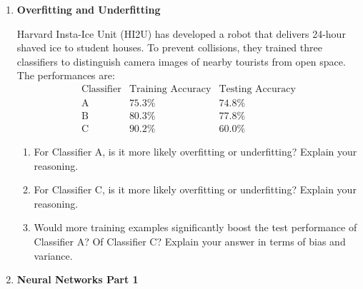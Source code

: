 \documentclass{article}
\begin{document}
\begin{enumerate}[label=\textbf{\arabic*.}]
    \item \textbf{Overfitting and Underfitting}

    Harvard Insta-Ice Unit (HI2U) has developed a robot that delivers 24-hour shaved ice to student houses. To prevent collisions, they trained three classifiers to distinguish camera images of nearby tourists from open space. The performances are:
    \[
    \begin{array}{lcc}
    \text{Classifier} & \text{Training Accuracy} & \text{Testing Accuracy} \\
    \hline
    \text{A} & 75.3\% & 74.8\% \\
    \text{B} & 80.3\% & 77.8\% \\
    \text{C} & 90.2\% & 60.0\%
    \end{array}
    \]
    \begin{enumerate}[label=(\alph*)]
        \item For Classifier A, is it more likely overfitting or underfitting? Explain your reasoning.
        \item For Classifier C, is it more likely overfitting or underfitting? Explain your reasoning.
        \item Would more training examples significantly boost the test performance of Classifier A? Of Classifier C? Explain your answer in terms of bias and variance.
    \end{enumerate}

    \item \textbf{Neural Networks Part 1}


\end{enumerate}
\end{document}

